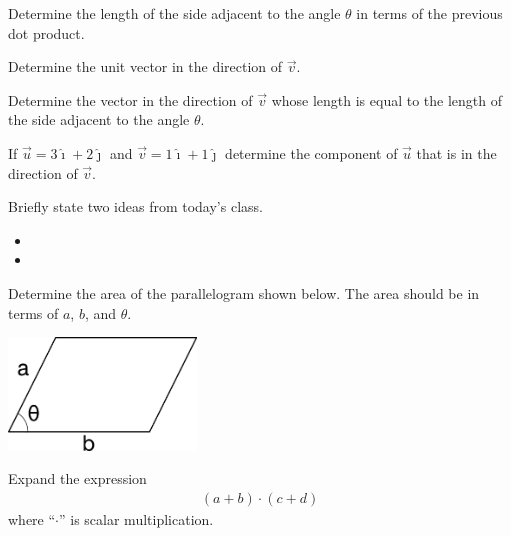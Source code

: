 \begin{problem}
\begin{subproblem}
    \item Determine the length of the side adjacent to the angle $\theta$ in terms of the previous dot product.
      \vfill

    \item Determine the unit vector in the direction of $\vec{v}$.
      \vfill

    \item Determine the vector in the direction of $\vec{v}$ whose length is equal to the length of the side adjacent to the angle $\theta$.
      \vfill

  \end{subproblem}

  \clearpage

  \item If $\vec{u}=3\hat{\imath}+2\hat{\jmath}$ and $\vec{v}=1\hat{\imath}+1\hat{\jmath}$ determine the component of $\vec{u}$ that is in the direction of $\vec{v}$.
    \vfill

\end{problem}

\postClass

\begin{problem}
\item Briefly state two ideas from today's class.
  \begin{itemize}
  \item
  \item
  \end{itemize}
\item
  \begin{subproblem}
    \item
  \end{subproblem}
\end{problem}



\begin{problem}
\item Determine the area of the parallelogram shown below. The area
  should be in terms of $a$, $b$, and $\theta$.

  \includegraphics[width=5cm]{../semI/ink/week11/parallelogram}

  \vfill

\item Expand the expression
  \begin{eqnarray*}
    \left( a + b \right) \cdot \left( c + d \right)
  \end{eqnarray*}
  where ``$\cdot$'' is scalar multiplication.

  \vfill

\end{problem}


